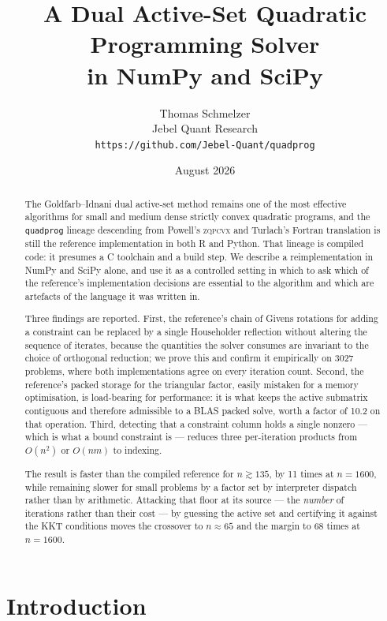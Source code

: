 \documentclass[11pt,a4paper]{article}
\title{\bf A Dual Active-Set Quadratic Programming Solver\\ in NumPy and SciPy}
\author{%
  Thomas Schmelzer\\[2pt]
  \small Jebel Quant Research\\
  \small \texttt{https://github.com/Jebel-Quant/quadprog}
}
\date{August 2026}
\theoremstyle{plain}
\theoremstyle{remark}
\begin{document}
\maketitle

\begin{abstract}
\noindent
The Goldfarb--Idnani dual active-set method \citep{goldfarb1983} remains one of
the most effective algorithms for small and medium dense strictly convex
quadratic programs, and the \texttt{quadprog} lineage descending from Powell's
\textsc{zqpcvx} \citep{powell1983} and Turlach's Fortran translation
\citep{turlach2019} is still the reference implementation in both R and Python.
That lineage is compiled code: it presumes a C toolchain and a build step. We
describe a reimplementation in NumPy and SciPy alone, and use it as a controlled
setting in which to ask which of the reference's implementation decisions are
essential to the algorithm and which are artefacts of the language it was written
in.

Three findings are reported. First, the reference's chain of Givens rotations for
adding a constraint can be replaced by a single Householder reflection without
altering the sequence of iterates, because the quantities the solver consumes are
invariant to the choice of orthogonal reduction; we prove this and confirm it
empirically on 3027 problems, where both implementations agree on every iteration
count. Second, the reference's packed storage for the triangular factor, easily
mistaken for a memory optimisation, is load-bearing for performance: it is what
keeps the active submatrix contiguous and therefore admissible to a BLAS packed
solve, worth a factor of 10.2 on that operation. Third, detecting that a
constraint column holds a single nonzero --- which is what a bound constraint is
--- reduces three per-iteration products from $O(n^2)$ or $O(nm)$ to indexing.

The result is faster than the compiled reference for $n \gtrsim 135$, by
11 times at $n = 1600$, while remaining slower for small problems by a
factor set by interpreter dispatch rather than by arithmetic. Attacking that
floor at its source --- the \emph{number} of iterations rather than their cost
--- by guessing the active set and certifying it against the KKT conditions moves
the crossover to $n \approx 65$ and the margin to 68 times at $n = 1600$.
\end{abstract}

\section{Introduction}
\label{sec:intro}
\end{document}
